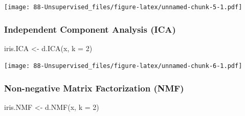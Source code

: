 \documentclass[
]{book}
\newenvironment{Shaded}{\begin{snugshade}}{\end{snugshade}}
\newcommand{\AttributeTok}[1]{\textcolor[rgb]{0.77,0.63,0.00}{#1}}
\newcommand{\DecValTok}[1]{\textcolor[rgb]{0.00,0.00,0.81}{#1}}
\newcommand{\FunctionTok}[1]{\textcolor[rgb]{0.00,0.00,0.00}{#1}}
\newcommand{\NormalTok}[1]{#1}
\newcommand{\OtherTok}[1]{\textcolor[rgb]{0.56,0.35,0.01}{#1}}
\newcommand{\SpecialCharTok}[1]{\textcolor[rgb]{0.00,0.00,0.00}{#1}}
\newcommand{\StringTok}[1]{\textcolor[rgb]{0.31,0.60,0.02}{#1}}
\begin{document}
\texttt{[image: 88-Unsupervised\_files/figure-latex/unnamed-chunk-5-1.pdf]}

\hypertarget{independent-component-analysis-ica}{%
\subsubsection{Independent Component Analysis (ICA)}\label{independent-component-analysis-ica}}

\begin{Shaded}
\begin{Highlighting}[]
\NormalTok{iris.ICA }\OtherTok{\textless{}{-}} \FunctionTok{d.ICA}\NormalTok{(x, }\AttributeTok{k =} \DecValTok{2}\NormalTok{)}
\end{Highlighting}
\end{Shaded}

\begin{Shaded}
\end{Shaded}

\texttt{[image: 88-Unsupervised\_files/figure-latex/unnamed-chunk-6-1.pdf]}

\hypertarget{non-negative-matrix-factorization-nmf}{%
\subsubsection{Non-negative Matrix Factorization (NMF)}\label{non-negative-matrix-factorization-nmf}}

\begin{Shaded}
\begin{Highlighting}[]
\NormalTok{iris.NMF }\OtherTok{\textless{}{-}} \FunctionTok{d.NMF}\NormalTok{(x, }\AttributeTok{k =} \DecValTok{2}\NormalTok{)}
\end{Highlighting}
\end{Shaded}

\begin{Shaded}
\end{Shaded}
\end{document}
